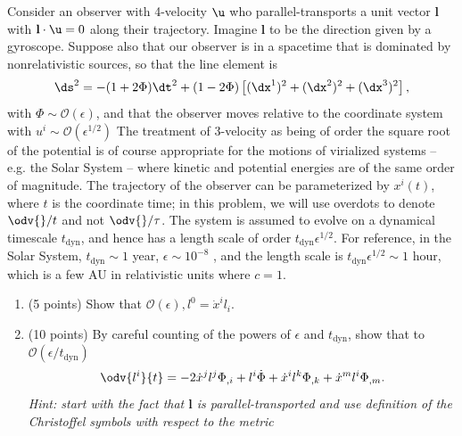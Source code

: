 \renewcommand\l{\mathbf{l}}
\renewcommand\O{\mathcal{O}}
\newcommand\dyn{\text{dyn}}
\renewcommand\B{\mathbf{B}}
\renewcommand\S{\mathbb{S}}

\begin{problem}
  Consider an observer with 4-velocity $\u$ who parallel-transports a unit vector $\l$ with $\l \cdot \u = 0$ along their trajectory. Imagine $\l$ to be the direction given by a gyroscope. Suppose also that our observer is in a spacetime that is dominated by nonrelativistic sources, so that the line element is
  \[%
    \ds^2 = -(1 + 2\Phi)\dt^2 + (1 - 2\Phi)\left[(\dx^1)^2 + (\dx^2)^2 + (\dx^3)^2\right]
  ,\]%
  with $\Phi \sim \O(\epsilon)$, and that the observer moves relative to the coordinate system with $u^i \sim \O(\epsilon^{1/2})$ The treatment of 3-velocity as being of order the square root of the potential is of course appropriate for the motions of virialized systems – e.g. the Solar System – where kinetic and potential energies are of the same order of magnitude. The trajectory of the observer can be parameterized by $x^i(t)$, where $t$ is the coordinate time; in this problem, we will use overdots to denote $\odv{}/{t}$ and not $\odv{}/{\tau}$. The system is assumed to evolve on a dynamical timescale $t_{\text{dyn}}$, and hence has a length scale of order $t_{\dyn}\epsilon^{1/2}$. For reference, in the Solar System, $t_{\dyn} \sim 1$ year, $\epsilon \sim 10^{-8}$ , and the length scale is $t_{\dyn}\epsilon^{1/2} \sim 1$ hour, which is a few AU in relativistic units where $c = 1$.
  \begin{enumerate}
    \item (5 points) Show that $\O(\epsilon), l^0 = \dot{x}^il_i$.
    \item (10 points) By careful counting of the powers of $\epsilon$ and $t_\dyn$, show that to $\O(\epsilon/t_\dyn)$
      \[%
        \odv{l^i}{t} = -2\dot{x}^jl^j\Phi_{,i} + l^i\dot{\Phi} + \dot{x}^il^k\Phi_{,k} + \dot{x}^ml^i\Phi_{,m}
      .\]%
      \textit{Hint: start with the fact that $\l$ is parallel-transported and use definition of the Christoffel symbols with respect to the metric}


\end{enumerate}
\end{problem}
